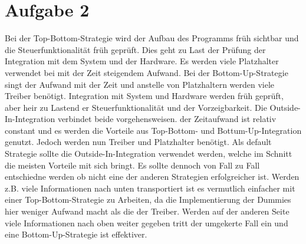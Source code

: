 \documentclass[a4paper]{report}
\begin{document}
\newpage\section*{Aufgabe 2}

Bei der Top-Bottom-Strategie wird der Aufbau des Programms früh sichtbar und die Steuerfunktionalität früh geprüft. Dies geht zu Last der Prüfung der Integration mit dem System und der Hardware. Es werden viele Platzhalter verwendet bei mit der Zeit steigendem Aufwand.
Bei der Bottom-Up-Strategie singt der Aufwand mit der Zeit und anstelle von Platzhaltern werden viele Treiber benötigt. Integration mit System und Hardware werden früh geprüft, aber heir zu Lastend er Steuerfunktionalität und der Vorzeigbarkeit.
Die Outside-In-Integration verbindet beide vorgehensweisen. der Zeitaufwand ist relativ constant und es werden die Vorteile aus Top-Bottom- und Bottum-Up-Integration genutzt. Jedoch werden nun Treiber und Platzhalter benötigt.
Als default Strategie sollte die Outside-In-Integration verwendet werden, welche im Schnitt die meisten Vorteile mit sich bringt. Es sollte dennoch von Fall zu Fall entschiedne werden ob nicht eine der anderen Strategien erfolgreicher ist. Werden z.B. viele Informationen nach unten transportiert ist es vermutlich einfacher mit einer Top-Bottom-Strategie zu Arbeiten, da die Implementierung der Dummies hier weniger Aufwand macht als die der Treiber. Werden auf der anderen Seite viele Informationen nach oben weiter gegeben tritt der umgekerte Fall ein und eine Bottom-Up-Strategie ist effektiver.
\end{document}
